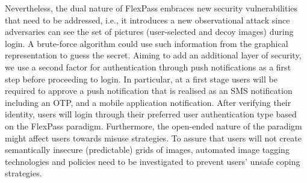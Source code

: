 Nevertheless, the dual nature of FlexPass embraces new security vulnerabilities that need to be addressed, i.e., it introduces a new observational attack since adversaries can see the set of pictures (user-selected and decoy images) during login. A brute-force algorithm could use such information from the graphical representation to guess the secret. Aiming to add an additional layer of security, we use a second factor for authentication through push notifications as a first step before proceeding to login. In particular, at a first stage users will be required to approve a push notification that is realised as an SMS notification including an OTP, and a mobile application notification. After verifying their identity, users will login through their preferred user authentication type based on the FlexPass paradigm. Furthermore, the open-ended nature of the paradigm might affect users towards misuse strategies. To assure that users will not create semantically insecure (predictable) grids of images, automated image tagging technologies and policies need to be investigated to prevent users’ unsafe coping strategies. 